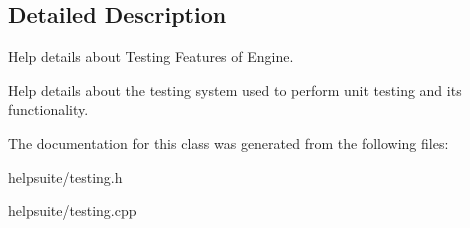 \subsection{Detailed Description}
Help details about Testing Features of Engine. 

Help details about the testing system used to perform unit testing and it\textquotesingle{}s functionality. 

The documentation for this class was generated from the following files\+:\begin{DoxyCompactItemize}
\item 
helpsuite/testing.\+h\item 
helpsuite/testing.\+cpp\end{DoxyCompactItemize}
